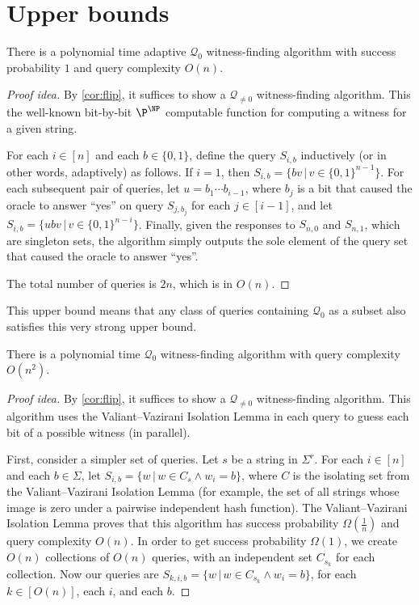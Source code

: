 \documentclass{article}
\newcommand{\mc}{\mathcal}
\begin{document}
\section{Upper bounds}

\begin{theorem}\label{thm:naive}
  There is a polynomial time adaptive $\mc{Q}_0$ witness-finding algorithm with success probability $1$ and query complexity $O(n)$.
\end{theorem}
\begin{proof}[Proof idea]
  By \autoref{cor:flip}, it suffices to show a $\mc{Q}_{\neq 0}$ witness-finding algorithm.
  This the well-known bit-by-bit $\P^\NP$ computable function for computing a witness for a given string.

  For each $i \in [n]$ and each $b \in \{0, 1\}$, define the query $S_{i, b}$ inductively (or in other words, adaptively) as follows.
  If $i = 1$, then $S_{i, b} = \{ b v \, | \, v \in {\{0, 1\}}^{n - 1}\}$.
  For each subsequent pair of queries, let $u = b_1 \dotsb b_{i - 1}$, where $b_j$ is a bit that caused the oracle to answer ``yes'' on query $S_{j, b_j}$ for each $j \in [i - 1]$, and let $S_{i, b} = \{ u b v \, | \, v \in {\{0, 1\}}^{n - i}\}$.
  Finally, given the responses to $S_{n, 0}$ and $S_{n, 1}$, which are singleton sets, the algorithm simply outputs the sole element of the query set that caused the oracle to answer ``yes''.

  The total number of queries is $2n$, which is in $O(n)$.
\end{proof}

This upper bound means that any class of queries containing $\mc{Q}_0$ as a subset also satisfies this very strong upper bound.

\begin{theorem}\label{thm:vv}
  There is a polynomial time $\mc{Q}_0$ witness-finding algorithm with query complexity $O(n^2)$.
\end{theorem}
\begin{proof}[Proof idea]
  By \autoref{cor:flip}, it suffices to show a $\mc{Q}_{\neq 0}$ witness-finding algorithm.
  This algorithm uses the Valiant--Vazirani Isolation Lemma in each query to guess each bit of a possible witness (in parallel).

  First, consider a simpler set of queries.
  Let $s$ be a string in $\Sigma^r$.
  For each $i \in [n]$ and each $b \in \Sigma$, let $S_{i, b} = \{ w \, | \, w \in C_s \land w_i = b\}$, where $C$ is the isolating set from the Valiant--Vazirani Isolation Lemma (for example, the set of all strings whose image is zero under a pairwise independent hash function).
  The Valiant--Vazirani Isolation Lemma proves that this algorithm has success probability $\Omega(\frac{1}{n})$ and query complexity $O(n)$.
  In order to get success probability $\Omega(1)$, we create $O(n)$ collections of $O(n)$ queries, with an independent set $C_{s_k}$ for each collection.
  Now our queries are $S_{k, i, b} = \{ w \, | \, w \in C_{s_k} \land w_i = b\}$, for each $k \in \left[O(n)\right]$, each $i$, and each $b$.
\end{proof}
\end{document}
